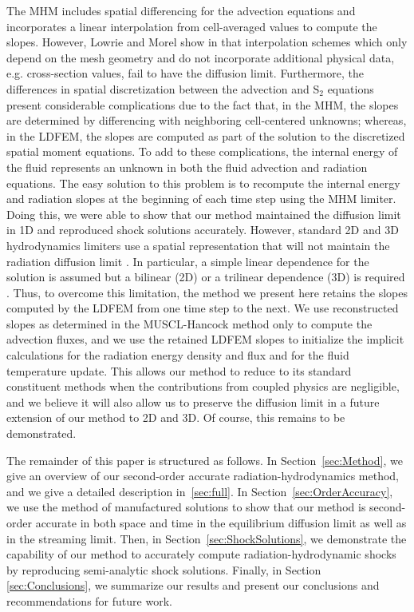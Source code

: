\documentclass[preprint,12pt]{elsarticle}
\begin{document}
The MHM includes spatial differencing for the advection equations and incorporates a linear interpolation from cell-averaged values to compute 
the slopes.  However, Lowrie and Morel show in \cite{lowriemorel} that interpolation schemes which only depend on the mesh geometry and do not 
incorporate additional physical data, e.g. cross-section values, fail to have the diffusion limit.  Furthermore, the differences in spatial 
discretization between the advection and S$_2$ equations present considerable complications due to the fact that, in the MHM, the slopes are 
determined by differencing with neighboring cell-centered unknowns; whereas, in the LDFEM, the slopes are computed as part of the solution to the 
discretized spatial moment equations.  To add to these complications, the internal energy of the fluid represents an unknown in both the 
fluid advection and radiation equations.  The easy solution to this problem is to recompute the internal energy and radiation 
slopes at the beginning of each time step using the MHM limiter.  Doing this, we were able to show that our method maintained the diffusion 
limit in 1D and reproduced shock solutions accurately.  However, standard 2D and 3D hydrodynamics limiters use a spatial representation that 
will not maintain the radiation diffusion limit \cite{zjwang}.  In particular, a simple linear dependence for the solution is assumed but a 
bilinear (2D) or a trilinear dependence (3D) is required \cite{adams}.  Thus, to overcome this limitation, the method we present here retains 
the slopes computed by the LDFEM from one time step to the next.  We use reconstructed slopes as determined in the MUSCL-Hancock method only to 
compute the advection fluxes, and we use the retained LDFEM slopes to initialize the implicit calculations for the radiation energy density and 
flux and for the fluid temperature update.  This allows our method to reduce to its standard constituent methods when the contributions from 
coupled physics are negligible, and we believe it will also allow us to preserve the diffusion limit in a future extension of our method to 
2D and 3D. Of course, this remains to be demonstrated.


The remainder of this paper is structured as follows.    In Section~\ref{sec:Method}, we give an overview of our second-order accurate
radiation-hydrodynamics method, and we give a detailed description in~\ref{sec:full}.  In Section~\ref{sec:OrderAccuracy}, we use the
method of manufactured solutions to show that our method is second-order accurate in both space and time in the equilibrium diffusion limit as well as
in the streaming limit.  Then, in Section~\ref{sec:ShockSolutions}, we demonstrate the capability of our method to accurately compute
radiation-hydrodynamic shocks by reproducing semi-analytic shock solutions.  Finally, in Section \ref{sec:Conclusions}, we summarize our results and
present our conclusions and recommendations for future work.
\end{document}
